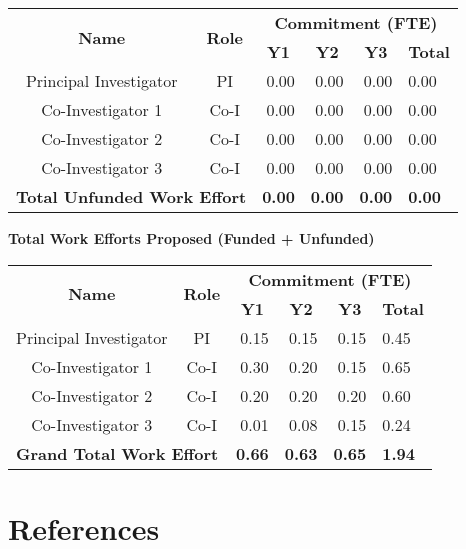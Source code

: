 \documentclass[oneside,12pt]{article}
\begin{document}
    \begin{table}[h]
        \centering
        \begin{tabular}{|c|c|r|r|r|l|}
            \hline
            \multirow{2}{*}{\textbf{Name}} & \multirow{2}{*}{\textbf{Role}} & \multicolumn{4}{c|}{\textbf{Commitment (FTE)}} \\
            \cline{3-6}
            & & \multicolumn{1}{c|}{\textbf{Y1}} & \multicolumn{1}{c|}{\textbf{Y2}} & \multicolumn{1}{c|}{\textbf{Y3}} & \multicolumn{1}{c|}{\textbf{Total}} \\
            \hline
            Principal Investigator & PI   & 0.00 & 0.00 & 0.00 & 0.00 \\
            Co-Investigator 1      & Co-I & 0.00 & 0.00 & 0.00 & 0.00 \\
            Co-Investigator 2      & Co-I & 0.00 & 0.00 & 0.00 & 0.00 \\
            Co-Investigator 3      & Co-I & 0.00 & 0.00 & 0.00 & 0.00 \\
            \hline
            \multicolumn{2}{|l|}{\textbf{Total Unfunded Work Effort}} & \textbf{0.00} & \textbf{0.00} & \textbf{0.00} & \textbf{0.00} \\
            \hline
        \end{tabular}
    \end{table}

    \vspace{1em}

    \begin{center}
        \textbf{Total Work Efforts Proposed (Funded + Unfunded)}
        \vspace{-1em}
    \end{center}

    \begin{table}[h]
        \centering
        \begin{tabular}{|c|c|r|r|r|l|}
            \hline
            \multirow{2}{*}{\textbf{Name}} & \multirow{2}{*}{\textbf{Role}} & \multicolumn{4}{c|}{\textbf{Commitment (FTE)}} \\
            \cline{3-6}
            & & \multicolumn{1}{c|}{\textbf{Y1}} & \multicolumn{1}{c|}{\textbf{Y2}} & \multicolumn{1}{c|}{\textbf{Y3}} & \multicolumn{1}{c|}{\textbf{Total}} \\
            \hline
            Principal Investigator & PI   & 0.15 & 0.15 & 0.15 & 0.45 \\
            Co-Investigator 1      & Co-I & 0.30 & 0.20 & 0.15 & 0.65 \\
            Co-Investigator 2      & Co-I & 0.20 & 0.20 & 0.20 & 0.60 \\
            Co-Investigator 3      & Co-I & 0.01 & 0.08 & 0.15 & 0.24 \\
            \hline
            \multicolumn{2}{|l|}{\textbf{Grand Total Work Effort}} & \textbf{0.66} & \textbf{0.63} & \textbf{0.65} & \textbf{1.94} \\
            \hline
        \end{tabular}
    \end{table}

    \clearpage

    \section{References}

    \renewcommand{\refname}{\vspace{-2em}}
    
\end{document}
